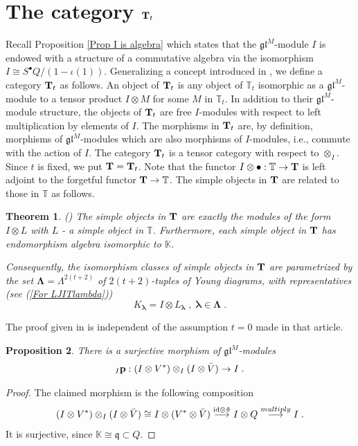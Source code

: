 \documentclass[12pt]{article}
\def\KK {{\mathbb K}}     %
\def\TT {{\mathbb T}}     %
\def\lw  {\longrightarrow}
\def\mk {\mathfrak}
\newtheorem{theorem}{Theorem}[section]
\newtheorem{prop}[theorem]{Proposition}
\begin{document}
\section{The category ${\bf T}_t$}

Recall Proposition \ref{Prop I is algebra} which states that the $\mk{gl}^M$-module $I$ is endowed with a structure of a commutative algebra via the isomorphism $I\cong S^\bullet Q/(1-\iota(1))$. Generalizing a concept introduced in \cite{Chirvasitu-Penkov-UTC}, we define a category ${\bf T}_t$ as follows. An object of ${\bf T}_t$ is any object of $\TT_t$ isomorphic as a $\mk{gl}^M$-module to a tensor product $I\otimes M$ for some $M$ in $\TT_t$. In addition to their $\mk{gl}^M$-module structure, the objects of ${\bf T}_t$ are free $I$-modules with respect to left multiplication by elements of $I$. The morphisms in ${\bf T}_t$ are, by definition, morphisms of $\mk{gl}^M$-modules which are also morphisms of $I$-modules, i.e., commute with the action of $I$. The category ${\bf T}_t$ is a tensor category with respect to $\otimes_I$. Since $t$ is fixed, we put ${\bf T}={\bf T}_t$. Note that the functor $I\otimes\bullet:\TT\to{\bf T}$ is left adjoint to the forgetful functor ${\bf T}\to\TT$. The simple objects in ${\bf T}$ are related to those in $\TT$ as follows.

\begin{theorem}\label{Theo L to IL} (\cite[Theorem~3.24]{Chirvasitu-Penkov-UTC})
The simple objects in ${\bf T}$ are exactly the modules of the form $I\otimes L$ with $L$ - a simple object in $\TT$. Furthermore, each simple object in ${\bf T}$ has endomorphism algebra isomorphic to $\KK$.

Consequently, the isomorphism classes of simple objects in ${\bf T}$ are parametrized by the set $\bm\Lambda=\Lambda^{2(t+2)}$ of $2(t+2)$-tuples of Young diagrams, with representatives (see (\ref{For LJITlambda}))
$$
K_{\bm\lambda}=I\otimes L_{\bm\lambda} \;,\; \bm\lambda\in\bm\Lambda \;.
$$
\end{theorem}

The proof given in \cite{Chirvasitu-Penkov-UTC} is independent of the assumption $t=0$ made in that article.

\begin{prop}
There is a surjective morphism of $\mk{gl}^M$-modules
$$
{_I}{\bf p}: (I\otimes V^*) \otimes_I (I\otimes \bar V) \to I \;.
$$
\end{prop}

\begin{proof}
The claimed morphism is the following composition
$$
(I\otimes V^*) \otimes_I (I\otimes \bar V) \cong I \otimes (V^*\otimes \bar V) \stackrel{{\rm id}\otimes\tilde\pi}{\lw} I\otimes Q \stackrel{multiply}{\lw} I \;. 
$$
It is surjective, since $\KK\cong \mk q\subset Q$.
\end{proof}
\end{document}
